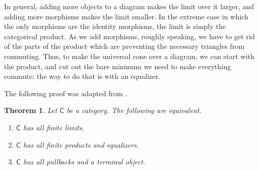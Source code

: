 \documentclass[a4paper]{report}
\theoremstyle{definition}
\theoremstyle{plain}
\newtheorem{theorem}{Theorem}[section]
\theoremstyle{remark}
\begin{document}
In general, adding more objects to a diagram makes the limit over it larger, and adding more morphisms makes the limit smaller. In the extreme case in which the only morphisms are the identity morphisms, the limit is simply the categorical product. As we add morphisms, roughly speaking, we have to get rid of the parts of the product which are preventing the necessary triangles from commuting. Thus, to make the universal cone over a diagram, we can start with the product, and cut out the bare minimum we need to make everything commute: the way to do that is with an equalizer.

The following proof was adapted from \cite{awodey-category-theory}. 
\begin{theorem}
  \label{thm:criterionforfinitelimits}
  Let $\mathsf{C}$ be a category. The following are equivalent.
  \begin{enumerate}
    \item $\mathsf{C}$ has all finite limits.
    \item $\mathsf{C}$ has all finite products and equalizers.
    \item $\mathsf{C}$ has all pullbacks and a terminal object.
  \end{enumerate}
\end{theorem}
\end{document}
